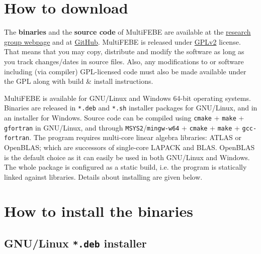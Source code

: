 \documentclass[a4paper,fleqn]{book}
\begin{document}
%
%

%
%

\section{How to download}

The \textbf{binaries} and the \textbf{source code} of MultiFEBE are available at the \href{http://www.mmc.siani.es/}{research group webpage} and at \href{https://github.com/mmc-siani-es/MultiFEBE}{GitHub}. MultiFEBE is released under \href{https://github.com/mmc-siani-es/MultiFEBE/blob/main/LICENSE}{GPLv2} license. That means that you may copy, distribute and modify the software as long as you track changes/dates in source files. Also, any modifications to or software including (via compiler) GPL-licensed code must also be made available under the GPL along with build \& install instructions.

MultiFEBE is available for GNU/Linux and Windows 64-bit operating systems. Binaries are released in \texttt{*.deb} and \texttt{*.sh} installer packages for GNU/Linux, and in an  installer for Windows. Source code can be compiled using \texttt{cmake} + \texttt{make} + \texttt{gfortran} in GNU/Linux, and through \texttt{MSYS2}/\texttt{mingw-w64} + \texttt{cmake} + \texttt{make} + \texttt{gcc-fortran}. The program requires multi-core linear algebra libraries: ATLAS or OpenBLAS; which are successors of single-core LAPACK and BLAS. OpenBLAS is the default choice as it can easily be used in both GNU/Linux and Windows. The whole package is configured as a static build, i.e. the program is statically linked against libraries. Details about installing are given below. 


\section{How to install the binaries}

\subsection{GNU/Linux \texttt{*.deb} installer}

\label{subsec:deb}
\end{document}
